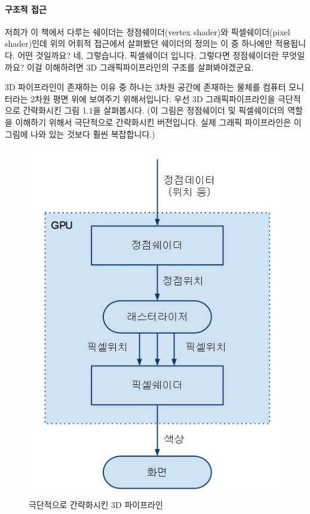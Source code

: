 \paragraph{구조적 접근}

저희가 이 책에서 다루는 쉐이더는 정점쉐이더(vertex shader)와 픽셀쉐이더(pixel shader)인데 위의 어휘적 접근에서 살펴봤던 쉐이더의 정의는 이 중 하나에만 적용됩니다. 어떤 것일까요? 네, 그렇습니다. 픽셀쉐이더 입니다. 그렇다면 정점쉐이더란 무엇일까요? 이걸 이해하려면 3D 그래픽파이프라인의 구조를 살펴봐야겠군요.

3D 파이프라인이 존재하는 이유 중 하나는 3차원 공간에 존재하는 물체를 컴퓨터 모니터라는 2차원 평면 위에 보여주기 위해서입니다. 우선 3D 그래픽파이프라인을 극단적으로 간략화시킨 그림 1.1을 살펴봅시다. (이 그림은 정점쉐이더 및 픽셀쉐이더의 역할을 이해하기 위해서 극단적으로 간략화시킨 버전입니다. 실제 그래픽 파이프라인은 이 그림에 나와 있는 것보다 훨씬 복잡합니다.)



\begin{figure}[h!]
    \centering
    \includegraphics[scale=0.5]{fig1.jpg}
    \caption{극단적으로 간략화시킨 3D 파이프라인}
\end{figure}



